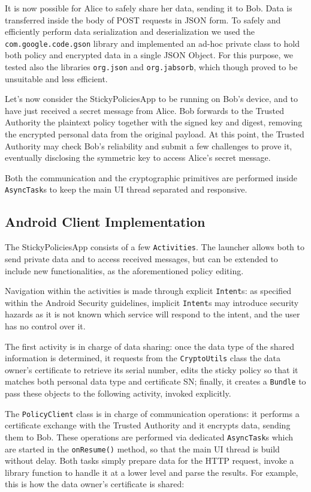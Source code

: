 It is now possible for Alice to safely share her data, sending it to Bob. Data is transferred inside the body of POST requests in JSON form. To safely and efficiently perform data serialization and deserialization we used the \texttt{com.google.code.gson} library and implemented an ad-hoc private class to hold both policy and encrypted data in a single JSON Object. For this purpose, we tested also the libraries \texttt{org.json} and \texttt{org.jabsorb}, which though proved to be unsuitable and less efficient.

Let's now consider the StickyPoliciesApp to be running on Bob's device, and to have just received a secret message from Alice. Bob forwards to the Trusted Authority the plaintext policy together with the signed key and digest, removing the encrypted personal data from the original payload. At this point, the Trusted Authority may check Bob's reliability and submit a few challenges to prove it, eventually disclosing the symmetric key to access Alice's secret message.

Both the communication and the cryptographic primitives are performed inside \texttt{AsyncTask}s to keep the main UI thread separated and responsive.

\subsection{Android Client Implementation}
The StickyPoliciesApp consists of a few \texttt{Activities}. The launcher allows both to send private data and to access received messages, but can be extended to include new functionalities, as the aforementioned policy editing.

Navigation within the activities is made through explicit \texttt{Intent}s: as specified within the Android Security guidelines, implicit \texttt{Intent}s may introduce security hazards as it is not known which service will respond to the intent, and the user has no control over it.

The first activity is in charge of data sharing: once the data type of the shared information is determined, it requests from the \texttt{CryptoUtils} class the data owner's certificate to retrieve its serial number, edits the sticky policy so that it matches both personal data type and certificate SN; finally, it creates a \texttt{Bundle} to pass these objects to the following activity, invoked explicitly.

The \texttt{PolicyClient} class is in charge of communication operations: it performs a certificate exchange with the Trusted Authority and it encrypts data, sending them to Bob. These operations are performed via dedicated \texttt{AsyncTask}s which are started in the \texttt{onResume()} method, so that the main UI thread is build without delay. Both tasks simply prepare data for the HTTP request, invoke a library function to handle it at a lower level and parse the results. For example, this is how the data owner's certificate is shared:


